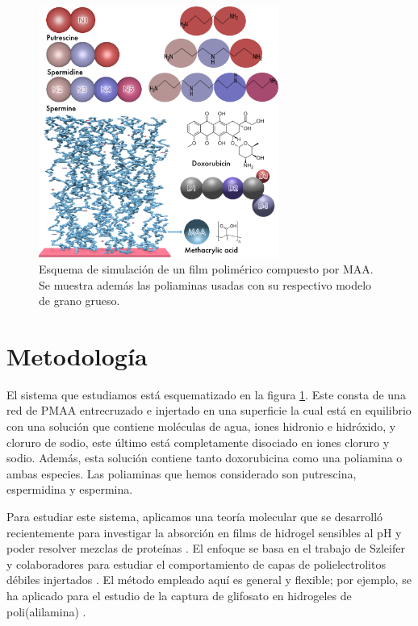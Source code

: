 \begin{figure}[!htb]
	\centering
	\includegraphics[width=0.7\textwidth]{Figures/graph-film/poliamines_model.png}
	\caption{Esquema de simulaci\'on de un film polim\'erico compuesto por MAA. Se muestra adem\'as las poliaminas usadas  con su respectivo  modelo de grano grueso.}
	\label{fig:film:model_poliamines}
\end{figure}





\section{Metodolog\'ia}


El sistema que estudiamos est\'a esquematizado en la figura \ref{fig:film:model_poliamines}.
Este consta de una  red de PMAA entrecruzado e injertado en una superficie  la cual est\'a en equilibrio con una soluci\'on que contiene mol\'eculas de agua, iones hidronio e hidr\'oxido, y cloruro de sodio, este \'ultimo est\'a completamente disociado en iones cloruro y sodio.
Adem\'as, esta soluci\'on contiene tanto doxorubicina como una poliamina o ambas especies.
Las poliaminas que hemos considerado son putrescina, espermidina y espermina.

Para estudiar este sistema, aplicamos una teor\'ia molecular que se desarroll\'o recientemente para investigar la absorci\'on en films de hidrogel sensibles al pH y poder resolver mezclas de prote\'inas \cite{Hagemann2018, longo2019protonation}.
El enfoque se basa en el trabajo de Szleifer y colaboradores para estudiar el comportamiento de capas de polielectrolitos d\'ebiles injertados  \cite{Nap2006, Gong2007PRL}.
El m\'etodo empleado aqu\'i es general y flexible; por ejemplo, se ha aplicado para el estudio de la captura de glifosato en hidrogeles de poli(alilamina) \cite{PerezChavez2018}.

